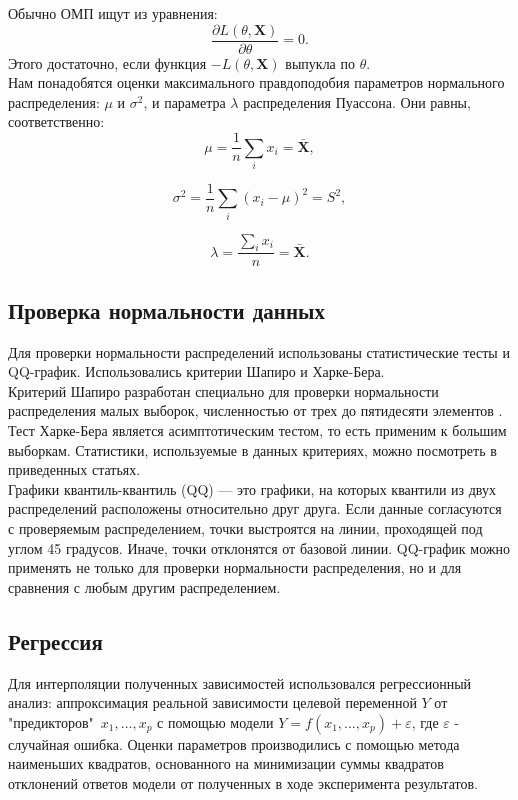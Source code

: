 Обычно ОМП ищут из уравнения:
\begin{equation}
\frac{\partial L(\theta, \mathbf{X})}{\partial \theta} = 0.
\end{equation}
Этого достаточно, если функция $-L(\theta, \mathbf{X})$ выпукла по $\theta$.\\

Нам понадобятся оценки максимального правдоподобия параметров нормального распределения: $\mu$ и $\sigma^2$, и параметра $\lambda$ распределения Пуассона. Они равны, соответственно:
\begin{equation}
\mu = \frac{1}{n}\sum_i x_i = \mathbf{\bar{X}},
\end{equation}

\begin{equation}
\sigma^2 =  \frac{1}{n}\sum_i (x_i-\mu)^2 = S^2,
\end{equation}

\begin{equation}
\lambda = \frac{\sum_i x_i}{n} = \mathbf{\bar{X}}.
\end{equation}

\subsection{Проверка нормальности данных}
Для проверки нормальности распределений использованы статистические тесты и QQ-график. Использовались критерии Шапиро и Харке-Бера.\\

Критерий Шапиро разработан специально для проверки нормальности распределения малых выборок, численностью от трех до пятидесяти элементов \cite{shapiro}.\\

Тест Харке-Бера \cite{jarqueber} является асимптотическим тестом, то есть применим к большим выборкам. Статистики, используемые в данных критериях, можно посмотреть в приведенных статьях.\\

Графики квантиль-квантиль (QQ) — это графики, на которых квантили из двух распределений расположены относительно друг друга. Если данные согласуются с проверяемым распределением, точки выстроятся на линии, проходящей под углом 45 градусов. Иначе, точки отклонятся от базовой линии. QQ-график можно применять не только для проверки нормальности распределения, но и для сравнения с любым другим распределением.

\subsection{Регрессия}
Для интерполяции полученных зависимостей использовался регрессионный анализ: аппроксимация реальной зависимости целевой переменной $Y$ от "предикторов"\ $x_1,\dots,x_p$ с помощью модели $Y=f(x_1,\dots,x_p)+\varepsilon$, где $\varepsilon$ - случайная ошибка. Оценки параметров производились с помощью метода наименьших квадратов, основанного на минимизации суммы квадратов отклонений ответов модели от полученных в ходе эксперимента результатов.

